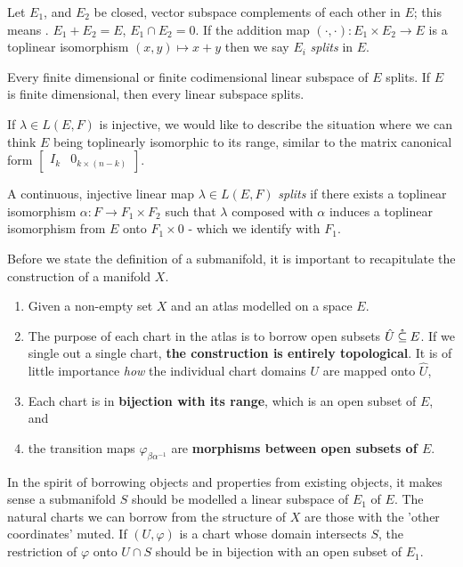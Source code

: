 \documentclass[../main-manifolds.tex]{subfiles}
\begin{document}
\begin{definition}[Splitting in $E$]\label{def:splitting-subspace}
Let $E_1$, and $E_2$ be closed, vector subspace complements of each other in $E$; this means . $E_1 + E_2 = E$, $E_1\cap E_2 = 0$. If the addition map $(\cdot,\cdot): E_1\times E_2\to E$ is a toplinear isomorphism $(x,y)\mapsto x + y$ then we say $E_i$ \emph{splits} in $E$.    
\end{definition}
\begin{remark}
Every finite dimensional or finite codimensional linear subspace of $E$ splits. If $E$ is finite dimensional, then every linear subspace splits.    
\end{remark}
If $\lambda\in L(E,F)$ is injective, we would like to describe the situation where we can think $E$ being toplinearly isomorphic to its range, similar to the matrix canonical form $\begin{bmatrix}I_{k} & 0_{k\times (n-k)} \end{bmatrix}$.
\begin{definition}[Splitting in $L(E,F)$]\label{def:splitting-clm}
A continuous, injective linear map $\lambda\in L(E,F)$ \emph{splits} if there exists a toplinear isomorphism $\alpha: F\to F_1\times F_2$ such that $\lambda$ composed with $\alpha$ induces a toplinear isomorphism from $E$ onto $F_1\times 0$ - which we identify with $F_1$.
\end{definition}
Before we state the definition of a submanifold, it is important to recapitulate the construction of a manifold $X$.
\begin{enumerate}
    \item Given a non-empty set $X$ and an atlas modelled on a space $E$.
    \item The purpose of each chart in the atlas is to borrow open subsets $\hat{U}\:\mathring{\subseteq}\: E$. If we single out a single chart, \textbf{the construction is entirely topological}. It is of little importance \emph{how} the individual chart domains $U$ are mapped onto $\hat{U}$,
    \item Each chart is in \textbf{bijection with its range}, which is an open subset of $E$, and
    \item the transition maps $\varphi_{\beta\alpha^{-1}}$ are \textbf{morphisms between open subsets of $E$}.
\end{enumerate}
In the spirit of borrowing objects and properties from existing objects, it makes sense a submanifold $S$ should be modelled a linear subspace of $E_1$ of $E$. The natural charts we can borrow from the structure of $X$ are those with the 'other coordinates' muted. If $(U,\varphi)$ is a chart whose domain intersects $S$, the restriction of $\varphi$ onto $U\cap S$ should be in bijection with an open subset of $E_1$. 
\end{document}

